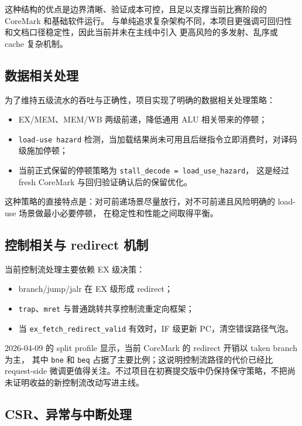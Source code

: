 这种结构的优点是边界清晰、验证成本可控，且足以支撑当前比赛阶段的 CoreMark 和基础软件运行。
与单纯追求复杂架构不同，本项目更强调可回归性和文档口径稳定性，因此当前并未在主线中引入
更高风险的多发射、乱序或 cache 复杂机制。

\subsection{数据相关处理}

为了维持五级流水的吞吐与正确性，项目实现了明确的数据相关处理策略：

\begin{itemize}
    \item EX/MEM、MEM/WB 两级前递，降低通用 ALU 相关带来的停顿；
    \item \texttt{load-use hazard} 检测，当加载结果尚未可用且后继指令立即消费时，对译码级施加停顿；
    \item 当前正式保留的停顿策略为 \texttt{stall\_decode = load\_use\_hazard}，
    这是经过 fresh CoreMark 与回归验证确认后的保留优化。
\end{itemize}

这种策略的直接特点是：对可前递场景尽量放行，对不可前递且风险明确的 load-use 场景做最小必要停顿，
在稳定性和性能之间取得平衡。

\subsection{控制相关与 redirect 机制}

当前控制流处理主要依赖 EX 级决策：

\begin{itemize}
    \item branch/jump/jalr 在 EX 级形成 redirect；
    \item \texttt{trap}、\texttt{mret} 与普通跳转共享控制流重定向框架；
    \item 当 \texttt{ex\_fetch\_redirect\_valid} 有效时，IF 级更新 PC，清空错误路径气泡。
\end{itemize}

2026-04-09 的 split profile 显示，当前 CoreMark 的 redirect 开销以 taken branch 为主，
其中 \texttt{bne} 和 \texttt{beq} 占据了主要比例；这说明控制流路径的代价已经比 request-side
微调更值得关注。不过项目在初赛提交版中仍保持保守策略，不把尚未证明收益的新控制流改动写进主线。


\subsection{CSR、异常与中断处理}

